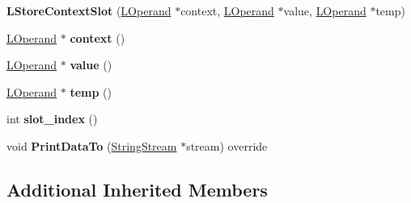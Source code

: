 \begin{DoxyCompactItemize}
\item 
{\bfseries L\+Store\+Context\+Slot} (\hyperlink{classv8_1_1internal_1_1_l_operand}{L\+Operand} $\ast$context, \hyperlink{classv8_1_1internal_1_1_l_operand}{L\+Operand} $\ast$value, \hyperlink{classv8_1_1internal_1_1_l_operand}{L\+Operand} $\ast$temp)\hypertarget{classv8_1_1internal_1_1_l_store_context_slot_ac22c1f367afeeac8612b5c3fce152218}{}\label{classv8_1_1internal_1_1_l_store_context_slot_ac22c1f367afeeac8612b5c3fce152218}

\item 
\hyperlink{classv8_1_1internal_1_1_l_operand}{L\+Operand} $\ast$ {\bfseries context} ()\hypertarget{classv8_1_1internal_1_1_l_store_context_slot_a6b072f758dab90336746518191c017e6}{}\label{classv8_1_1internal_1_1_l_store_context_slot_a6b072f758dab90336746518191c017e6}

\item 
\hyperlink{classv8_1_1internal_1_1_l_operand}{L\+Operand} $\ast$ {\bfseries value} ()\hypertarget{classv8_1_1internal_1_1_l_store_context_slot_a0c28014969c34254ff6c3adcac58abbb}{}\label{classv8_1_1internal_1_1_l_store_context_slot_a0c28014969c34254ff6c3adcac58abbb}

\item 
\hyperlink{classv8_1_1internal_1_1_l_operand}{L\+Operand} $\ast$ {\bfseries temp} ()\hypertarget{classv8_1_1internal_1_1_l_store_context_slot_a21856d771e86c39c98d6c66fa824c523}{}\label{classv8_1_1internal_1_1_l_store_context_slot_a21856d771e86c39c98d6c66fa824c523}

\item 
int {\bfseries slot\+\_\+index} ()\hypertarget{classv8_1_1internal_1_1_l_store_context_slot_ae3af6274dd8f0678313b444f513b440d}{}\label{classv8_1_1internal_1_1_l_store_context_slot_ae3af6274dd8f0678313b444f513b440d}

\item 
void {\bfseries Print\+Data\+To} (\hyperlink{classv8_1_1internal_1_1_string_stream}{String\+Stream} $\ast$stream) override\hypertarget{classv8_1_1internal_1_1_l_store_context_slot_a559e1a9bb270f10754b7abd4f54768dc}{}\label{classv8_1_1internal_1_1_l_store_context_slot_a559e1a9bb270f10754b7abd4f54768dc}

\end{DoxyCompactItemize}
\subsection*{Additional Inherited Members}


